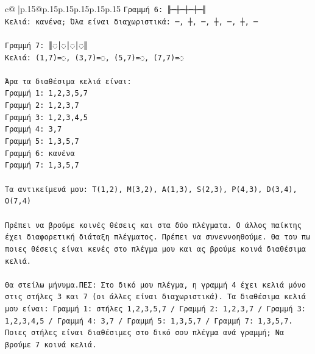 \documentclass{article}
\begin{document}
{\begin{supertabular}{c@{$\;$}|p{.15\linewidth}@{}p{.15\linewidth}p{.15\linewidth}p{.15\linewidth}p{.15\linewidth}p{.15\linewidth}}
{{{\texttt{Γραμμή 6: ╟─┼─┼─┼─╢} \\
\texttt{Κελιά: κανένα; Όλα είναι διαχωριστικά: ─, ┼, ─, ┼, ─, ┼, ─} \\
\\ 
\texttt{Γραμμή 7: ║◌│◌│◌│◌║} \\
\texttt{Κελιά: (1,7)=◌, (3,7)=◌, (5,7)=◌, (7,7)=◌} \\
\\ 
\texttt{Άρα τα διαθέσιμα κελιά είναι:} \\
\texttt{Γραμμή 1: 1,2,3,5,7} \\
\texttt{Γραμμή 2: 1,2,3,7} \\
\texttt{Γραμμή 3: 1,2,3,4,5} \\
\texttt{Γραμμή 4: 3,7} \\
\texttt{Γραμμή 5: 1,3,5,7} \\
\texttt{Γραμμή 6: κανένα} \\
\texttt{Γραμμή 7: 1,3,5,7} \\
\\ 
\texttt{Τα αντικείμενά μου: T(1,2), M(3,2), A(1,3), S(2,3), P(4,3), D(3,4), O(7,4)} \\
\\ 
\texttt{Πρέπει να βρούμε κοινές θέσεις και στα δύο πλέγματα. Ο άλλος παίκτης έχει διαφορετική διάταξη πλέγματος. Πρέπει να συνεννοηθούμε. Θα του πω ποιες θέσεις είναι κενές στο πλέγμα μου και ας βρούμε κοινά διαθέσιμα κελιά.} \\
\\ 
\texttt{Θα στείλω μήνυμα.ΠΕΣ: Στο δικό μου πλέγμα, η γραμμή 4 έχει κελιά μόνο στις στήλες 3 και 7 (οι άλλες είναι διαχωριστικά). Τα διαθέσιμα κελιά μου είναι: Γραμμή 1: στήλες 1,2,3,5,7 / Γραμμή 2: 1,2,3,7 / Γραμμή 3: 1,2,3,4,5 / Γραμμή 4: 3,7 / Γραμμή 5: 1,3,5,7 / Γραμμή 7: 1,3,5,7. Ποιες στήλες είναι διαθέσιμες στο δικό σου πλέγμα ανά γραμμή; Να βρούμε 7 κοινά κελιά.} \\
            }
        }
    }
     \\ \\


\end{supertabular}}
\end{document}
